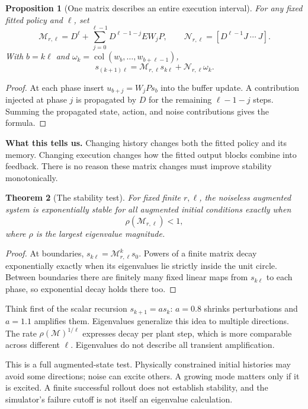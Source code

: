 \documentclass[12 pt]{article}        	%
\newtheorem{theorem}{Theorem}[section]
\newtheorem{proposition}[theorem]{Proposition}
\theoremstyle{definition}
\begin{document}
\begin{proposition}[One matrix describes an entire execution interval]\label{prop:boundary}
For any fixed fitted policy and $\ell$, set
\[
\mathcal M_{r,\ell}=D^\ell+\sum_{j=0}^{\ell-1}D^{\ell-1-j}EW_jP,
\qquad
\mathcal N_{r,\ell}=[D^{\ell-1}J\ \cdots\ J].
\]
With $b=k\ell$ and $\omega_k=\operatorname{col}(w_b,\ldots,w_{b+\ell-1})$,
\[
\boxed{s_{(k+1)\ell}=\mathcal M_{r,\ell}s_{k\ell}+\mathcal N_{r,\ell}\omega_k.}
\]
\end{proposition}
\begin{proof}
At each phase insert $u_{b+j}=W_jPs_b$ into the buffer update. A contribution injected at phase $j$ is propagated by $D$ for the remaining $\ell-1-j$ steps. Summing the propagated state, action, and noise contributions gives the formula.
\end{proof}

\textbf{What this tells us.} Changing history changes both the fitted policy and its memory. Changing execution changes how the fitted output blocks combine into feedback. There is no reason these matrix changes must improve stability monotonically.

\begin{theorem}[The stability test]
For fixed finite $r,\ell$, the noiseless augmented system is exponentially stable for all augmented initial conditions exactly when
\[
\rho(\mathcal M_{r,\ell})<1,
\]
where $\rho$ is the largest eigenvalue magnitude.
\end{theorem}
\begin{proof}
At boundaries, $s_{k\ell}=\mathcal M_{r,\ell}^ks_0$. Powers of a finite matrix decay exponentially exactly when its eigenvalues lie strictly inside the unit circle. Between boundaries there are finitely many fixed linear maps from $s_{k\ell}$ to each phase, so exponential decay holds there too.
\end{proof}

Think first of the scalar recursion $s_{k+1}=as_k$: $a=0.8$ shrinks perturbations and $a=1.1$ amplifies them. Eigenvalues generalize this idea to multiple directions. The rate $\rho(\mathcal M)^{1/\ell}$ expresses decay per plant step, which is more comparable across different $\ell$. Eigenvalues do not describe all transient amplification.

This is a full augmented-state test. Physically constrained initial histories may avoid some directions; noise can excite others. A growing mode matters only if it is excited. A finite successful rollout does not establish stability, and the simulator's failure cutoff is not itself an eigenvalue calculation.
\end{document}
